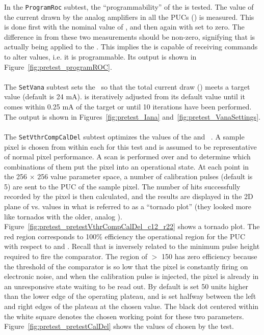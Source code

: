 In the {\tt ProgramRoc} subtest, the ``programmability'' of the \roc is tested.
The value of the current drawn by the analog amplifiers in all the PUCs (\iana) is measured.
This is done first with the nominal value of \vana, and then again with \vana set to zero.
The difference in \iana from these two measurements should be non-zero,
signifying that \vana is actually being applied to the \roc.
This implies the \roc is capable of receiving commands to alter \dac values, i.e. it is programmable.
Its output is shown in Figure~\ref{fig:pretest_programROC}.
\\\\
The {\tt SetVana} subtest sets the \vana~\dac so that the total current draw (\iana) meets a target value (default is 24 mA).
\vana is iteratively adjusted from its default value until it comes within 0.25 mA of the target 
or until 10 iterations have been performed.  The output is shown in Figures~\ref{fig:pretest_Iana} and~\ref{fig:pretest_VanaSettings}.
\\\\
The {\tt SetVthrCompCalDel} subtest optimizes the values of the \vthrcomp and \caldel~\dacs.
A sample pixel is chosen from within each \roc for this test and is assumed to be representative of normal pixel performance.
A scan is performed over \vthrcomp and \caldel to determine which combinations of them put the pixel into an operational state.
At each point in the 256 $\times$ 256 value parameter space,
a number of calibration pulses (default is 5) are sent to the PUC of the sample pixel.
The number of hits successfully recorded by the pixel is then calculated,
and the results are displayed in the 2D plane of \vthrcomp vs. \caldel values
in what is referred to as a ``tornado plot'' (they looked more like tornados with the older, analog \roc).
Figure~\ref{fig:pretest_pretestVthrCompCalDel_c12_r22} shows a tornado plot.
The red region corresponds to 100\% efficiency \textendash\xspace 
the operational region for the PUC with respect to \vthrcomp and \caldel.
Recall that \vthrcomp is inversely related to the minimum pulse height required to fire the comparator.
The region of \vthrcomp $>$ 150 has zero efficiency because
the threshold of the comparator is so low that the pixel is constantly firing on electronic noise,
and when the calibration pulse is injected,
the pixel is already in an unresponsive state waiting to be read out.
By default \vthrcomp is set 50 units higher than the lower edge of the operating plateau,
and \caldel is set halfway between the left and right edges of the plateau at the chosen \vthrcomp value.
The black dot centered within the white square denotes the chosen working point for these two parameters.
Figure~\ref{fig:pretest_pretestCalDel} shows the values of \caldel chosen by the test.

